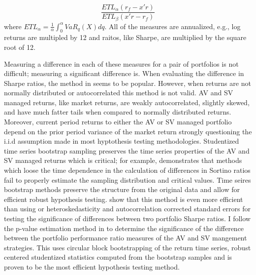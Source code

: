 \begin{equation}
\frac {ETL_{\alpha }\left({{r_{f}}-x'r}\right)}{ETL_{\beta}\left({x'r-{r_{f}}}\right)}
\end{equation}
where $ET{L_{\alpha }}={\frac {1}{\alpha }}\int _{0}^{\alpha }{VaR_{q}\left(X\right)dq}$. All of the measures are annualized, e.g., log returns are multipled by 12 and raitos, like Sharpe, are multiplied by the square root of 12. 

Measuring a difference in each of these measures for a pair of portfolios is not difficult; measuring a significant difference is.  When evaluating the difference in Sharpe ratios, the method in \citet{memmel_performance_2003} seems to be popular. However, when returns are not normally distributed or autocorrelated this method is not valid. AV and SV managed returns, like market returns, are weakly autocorrelated, slightly skewed, and have much fatter tails when compared to normally distributed returns. Moreover, current period returns to either the AV or SV managed portfolio depend on the prior period variance of the market return strongly questioning the i.i.d assumption made in most hyptothesis testing methodologies. Studentized time series bootstrap sampling preserves the time series properties of the AV and SV managed returns which is critical; for example, \citet{scherer_alternative_2004} demonstrates that methods which loose the time dependence in the calculation of differences in Sortino ratios fail to properly estimate the sampling distribution and critical values. Time seires bootstrap methods preserve the structure from the original data and allow for efficient robust hypothesis testing. \citep{politis_stationary_1994,davison1997bootstrap} \citet{ledoit_robust_2008} show that this method is even more efficient than using \citet{newey_simple_1987} or \citet{andrews_improved_1992} heteroskedasticity and autocorrelation corrected standard errors for testing the significance of differences between two portfolio Sharpe ratios. I follow the p-value estimation method in \citet{ledoit_robust_2008} to determine the significance of the difference between the portfolio performance ratio measures of the AV and SV mangement strategies. This uses circular block bootstrapping of the return time series, robust centered studentized statistics computed from the bootstrap samples and is proven to be the most efficient hypothesis testing method. \citet{politis_general_1992,ledoit_robust_2008}


